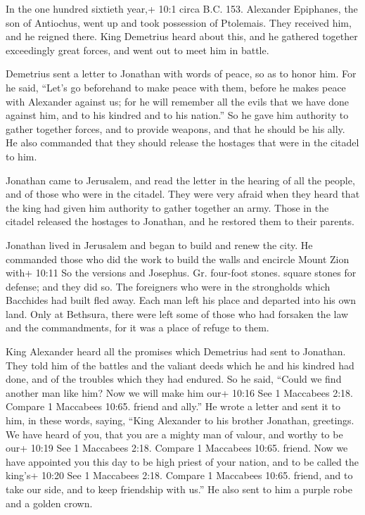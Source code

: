  In the one hundred sixtieth year,+ 10:1 circa B.C. 153.
Alexander Epiphanes, the son of Antiochus, went up and took possession
of Ptolemais. They received him, and he reigned there.  King
Demetrius heard about this, and he gathered together exceedingly great
forces, and went out to meet him in battle.

 Demetrius sent a letter to Jonathan with words of peace, so
as to honor him.  For he said, ``Let's go beforehand to make
peace with them, before he makes peace with Alexander against us;
 for he will remember all the evils that we have done
against him, and to his kindred and to his nation.''  So he
gave him authority to gather together forces, and to provide weapons,
and that he should be his ally. He also commanded that they should
release the hostages that were in the citadel to him.

 Jonathan came to Jerusalem, and read the letter in the
hearing of all the people, and of those who were in the citadel.
 They were very afraid when they heard that the king had
given him authority to gather together an army.  Those in
the citadel released the hostages to Jonathan, and he restored them to
their parents.

 Jonathan lived in Jerusalem and began to build and renew
the city.  He commanded those who did the work to build the
walls and encircle Mount Zion with+ 10:11 So the versions and Josephus.
Gr. four-foot stones. square stones for defense; and they did so.
 The foreigners who were in the strongholds which Bacchides
had built fled away.  Each man left his place and departed
into his own land.  Only at Bethsura, there were left some
of those who had forsaken the law and the commandments, for it was a
place of refuge to them.

 King Alexander heard all the promises which Demetrius had
sent to Jonathan. They told him of the battles and the valiant deeds
which he and his kindred had done, and of the troubles which they had
endured.  So he said, ``Could we find another man like him?
Now we will make him our+ 10:16 See 1 Maccabees 2:18. Compare 1
Maccabees 10:65. friend and ally.''  He wrote a letter and
sent it to him, in these words, saying,  ``King Alexander
to his brother Jonathan, greetings.  We have heard of you,
that you are a mighty man of valour, and worthy to be our+ 10:19 See 1
Maccabees 2:18. Compare 1 Maccabees 10:65. friend.  Now we
have appointed you this day to be high priest of your nation, and to be
called the king's+ 10:20 See 1 Maccabees 2:18. Compare 1 Maccabees
10:65. friend, and to take our side, and to keep friendship with us.''
He also sent to him a purple robe and a golden crown.

